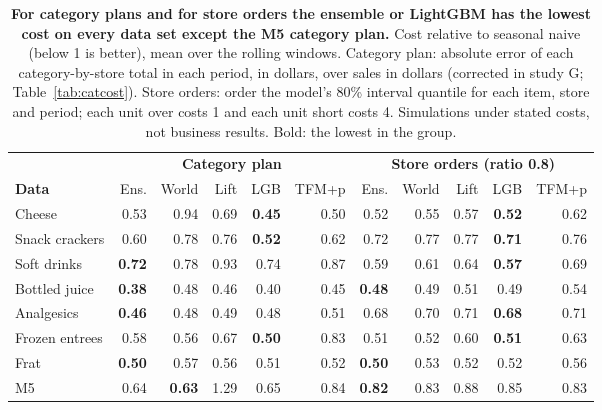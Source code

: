 \begin{table}[t]
\centering
\caption{\textbf{For category plans and for store orders the ensemble or LightGBM has the lowest cost on every
data set except the M5 category plan.} Cost relative to seasonal naive (below 1 is better), mean over the rolling
windows. Category plan: absolute error of each category-by-store total in each period, in dollars, over sales in
dollars (corrected in study G; Table~\ref{tab:catcost}). Store orders: order the model's 80\% interval
quantile for each item, store and period; each unit over costs 1 and each unit short costs 4. Simulations under
stated costs, not business results. Bold: the lowest in the group.}
\label{tab:decisions}
\footnotesize
\setlength{\tabcolsep}{3.6pt}
\begin{tabular}{l*{10}{r}}
\toprule
 & \multicolumn{5}{c}{\textbf{Category plan}} & \multicolumn{5}{c}{\textbf{Store orders (ratio 0.8)}} \\
\cmidrule(lr){2-6}\cmidrule(lr){7-11}
\textbf{Data} & Ens. & World & Lift & LGB & TFM+p & Ens. & World & Lift & LGB & TFM+p \\
\midrule
Cheese & 0.53 & 0.94 & 0.69 & \textbf{0.45} & 0.50 & 0.52 & 0.55 & 0.57 & \textbf{0.52} & 0.62 \\
Snack crackers & 0.60 & 0.78 & 0.76 & \textbf{0.52} & 0.62 & 0.72 & 0.77 & 0.77 & \textbf{0.71} & 0.76 \\
Soft drinks & \textbf{0.72} & 0.78 & 0.93 & 0.74 & 0.87 & 0.59 & 0.61 & 0.64 & \textbf{0.57} & 0.69 \\
Bottled juice & \textbf{0.38} & 0.48 & 0.46 & 0.40 & 0.45 & \textbf{0.48} & 0.49 & 0.51 & 0.49 & 0.54 \\
Analgesics & \textbf{0.46} & 0.48 & 0.49 & 0.48 & 0.51 & 0.68 & 0.70 & 0.71 & \textbf{0.68} & 0.71 \\
Frozen entrees & 0.58 & 0.56 & 0.67 & \textbf{0.50} & 0.83 & 0.51 & 0.52 & 0.60 & \textbf{0.51} & 0.63 \\
Frat & \textbf{0.50} & 0.57 & 0.56 & 0.51 & 0.52 & \textbf{0.50} & 0.53 & 0.52 & 0.52 & 0.56 \\
M5 & 0.64 & \textbf{0.63} & 1.29 & 0.65 & 0.84 & \textbf{0.82} & 0.83 & 0.88 & 0.85 & 0.83 \\
\bottomrule
\end{tabular}
\end{table}
